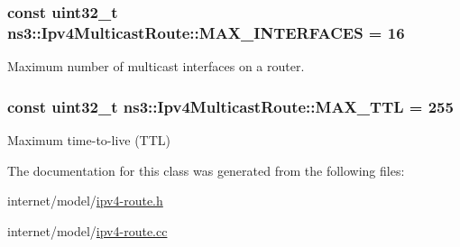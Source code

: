 \subsubsection[{\texorpdfstring{M\+A\+X\+\_\+\+I\+N\+T\+E\+R\+F\+A\+C\+ES}{MAX_INTERFACES}}]{\setlength{\rightskip}{0pt plus 5cm}const uint32\+\_\+t ns3\+::\+Ipv4\+Multicast\+Route\+::\+M\+A\+X\+\_\+\+I\+N\+T\+E\+R\+F\+A\+C\+ES = 16\hspace{0.3cm}{\ttfamily [static]}}\hypertarget{classns3_1_1Ipv4MulticastRoute_a9695fa6d0caa266aa4ab3b5cd2d86267}{}\label{classns3_1_1Ipv4MulticastRoute_a9695fa6d0caa266aa4ab3b5cd2d86267}


Maximum number of multicast interfaces on a router. 

\subsubsection[{\texorpdfstring{M\+A\+X\+\_\+\+T\+TL}{MAX_TTL}}]{\setlength{\rightskip}{0pt plus 5cm}const uint32\+\_\+t ns3\+::\+Ipv4\+Multicast\+Route\+::\+M\+A\+X\+\_\+\+T\+TL = 255\hspace{0.3cm}{\ttfamily [static]}}\hypertarget{classns3_1_1Ipv4MulticastRoute_ab7118310b9ac11a437788db9c1250412}{}\label{classns3_1_1Ipv4MulticastRoute_ab7118310b9ac11a437788db9c1250412}


Maximum time-\/to-\/live (T\+TL) 



The documentation for this class was generated from the following files\+:\begin{DoxyCompactItemize}
\item 
internet/model/\hyperlink{ipv4-route_8h}{ipv4-\/route.\+h}\item 
internet/model/\hyperlink{ipv4-route_8cc}{ipv4-\/route.\+cc}\end{DoxyCompactItemize}

